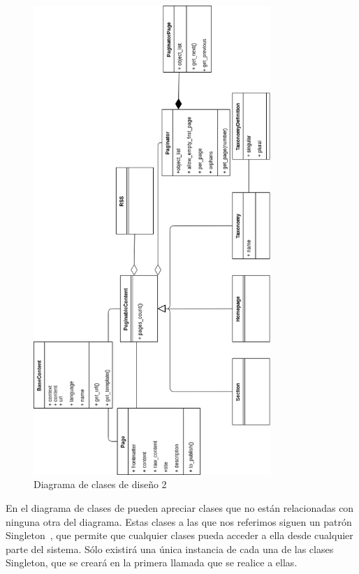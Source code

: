 \begin{figure}[htbp]
    \centering
    \includegraphics[width=0.8\textwidth]{5_diseno/clases_de_diseno2}
    \caption{Diagrama de clases de diseño 2}
    \label{fig:clases_diseno}
\end{figure}

En el diagrama de clases de pueden apreciar clases que no están relacionadas
con ninguna otra del diagrama. Estas clases a las que nos referimos siguen un patrón Singleton~\cite{singleton}, que
permite que cualquier clases pueda acceder a ella desde cualquier parte del sistema. Sólo existirá una
única instancia de cada una de las clases Singleton, que se creará en la primera llamada que se realice a
ellas.


